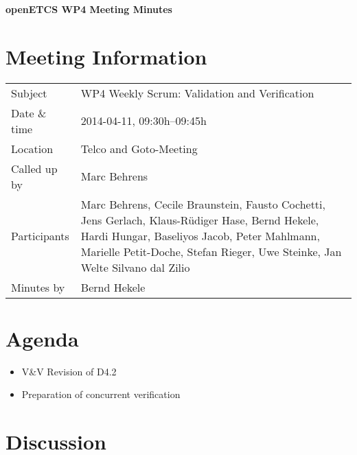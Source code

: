 \documentclass[a4paper, 11pt]{article}
\begin{document}
{\begin{center}\huge\bf openETCS WP4 Meeting Minutes\end{center}}
\section{Meeting Information}

\renewcommand{\arraystretch}{1.5}
\begin{supertabular}{m{.2\textwidth}m{.8\textwidth}}
Subject & WP4 Weekly Scrum: Validation and Verification\\
Date \& time & 2014-04-11, 09:30h--09:45h\\
Location & Telco and Goto-Meeting\\
Called up by & Marc Behrens\\
Participants &
Marc Behrens,
Cecile Braunstein,
Fausto Cochetti,
Jens Gerlach,
Klaus-R\"udiger Hase,
Bernd Hekele,
Hardi Hungar,
Baseliyos Jacob,
Peter Mahlmann,
Marielle Petit-Doche,
Stefan Rieger,
Uwe Steinke,
Jan Welte
Silvano dal Zilio
\\

Minutes by & Bernd Hekele\\

\end{supertabular}
\renewcommand{\arraystretch}{1.0}


\section{{Agenda}}
\begin{itemize}
\item V\&V Revision of D4.2
\item Preparation of concurrent verification
\end{itemize}

\section{Discussion}
\end{document}
